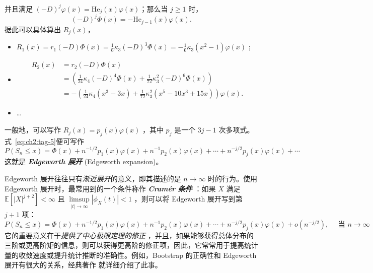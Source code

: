 并且满足 $(-D)^j\varphi(x)=\mathrm{He}_{j}(x)\varphi(x)$；那么当 $j\ge 1$ 时，
\[
(-D)^j\Phi(x)=-\mathrm{He}_{j-1}(x)\varphi(x).
\]
据此可以具体算出 $R_j(x)$，

\begin{itemize}
\tightlist
\item
  $R_1(x)=r_1(-D)\Phi(x)=\frac16\kappa_3(-D)^3\Phi(x)=-\frac16\kappa_3(x^2-1)\varphi(x)$ ;
\item
  \[
  \begin{aligned}
  R_2(x)&=r_2(-D)\Phi(x)\\
  &=\left(\frac1{24}\kappa_4 (-D)^4\Phi(x)+\frac1{72}\kappa_3^2(-D)^6\Phi(x)\right)\\
  &=-\left(\frac1{24}\kappa_4(x^3-3x)+\frac1{72}\kappa_3^2(x^5-10x^3+15x)\right)\varphi(x).
  \end{aligned}
  \]
\item
  \ldots{}
\end{itemize}

一般地，可以写作 $R_j(x)=p_j(x)\varphi(x)$ ，其中 $p_j$ 是一个 $3j-1$ 次多项式。 式~\eqref{eq:ch2:tag-5}便可写作\[P(S_n\le x)=\Phi(x)+n^{-1/2}p_1(x)\varphi(x)+n^{-1}p_2(x)\varphi(x)+\cdots+n^{-j/2 }p_j(x)\varphi(x)+\cdots\]
这就是 \textbf{\emph{Edgeworth 展开 }} (Edgeworth expansion)。

Edgeworth 展开往往只有\emph{渐近展开}的意义，即其描述的是 $n\to\infty$ 时的行为。使用 Edgeworth 展开时，最常用到的一个条件称作 \textbf{\emph{Cramér 条件 }}：如果 $X$ 满足 $\mathbb{E}[|X|^{j+2}]<\infty$ 且 $\limsup\limits_{|t|\to\infty}|\phi_X(t)|<1$ ，则可以将 Edgeworth 展开写到第 $j+1$ 项：\[P(S_n\le x)=\Phi(x)+n^{-1/2}p_1(x)\varphi(x)+n^{-1}p_2(x)\varphi(x)+\cdots+n^{-j/2 }p_j(x)\varphi(x)+o(n^{-j/2}),\quad \text{ 当 }n\to\infty\]
它的重要意义在于\emph{提供了中心极限定理的修正 }，并且，如果能够获得总体分布的三阶或更高阶矩的信息，则可以获得更高阶的修正项，因此，它常常用于提高统计量的收敛速度或提升统计推断的准确性。例如，Bootstrap 的正确性和 Edgeworth 展开有很大的关系，经典著作 \cite{hall1992} 就详细介绍了此事。

